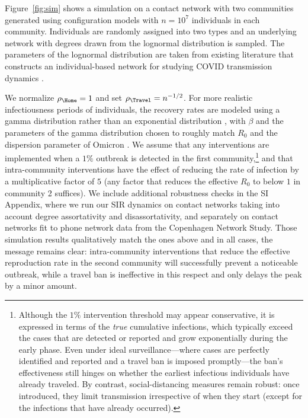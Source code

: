 \documentclass[11pt]{article}
\begin{document}
\newpage


\newpage

Figure~\ref{fig:sim} shows a simulation on a contact network with two communities generated using configuration models with $n = 10^7$ individuals in each community. Individuals are randomly assigned into two types and an underlying network with degrees drawn from the lognormal distribution is sampled. The parameters of the lognormal distribution are taken from existing literature that constructs an individual-based network for studying COVID transmission dynamics \cite{hill2021network}.

We normalize $\rho_\Home = 1$ and set $\rho_\Travel = n^{-1/2}$. For more realistic infectiousness periods of individuals, the recovery rates are modeled using a gamma distribution rather than an exponential distribution \cite{lloyd2001realistic, wearing2005appropriate}, with $\beta$ and the parameters of the gamma distribution chosen to roughly match $R_0$ and the dispersion parameter of Omicron \cite{kremer2022serial, sender2022unmitigated}. We assume that any interventions are implemented when a $1\%$ outbreak is detected in the first community,\footnote{Although the $1\%$ intervention threshold may appear conservative, it is expressed in terms of the \emph{true} cumulative infections, which typically exceed the cases that are detected or reported and grow exponentially during the early phase. Even under ideal surveillance---where cases are perfectly identified and reported and a travel ban is imposed promptly---the ban's effectiveness still hinges on whether the earliest infectious individuals have already traveled. By contrast, social-distancing measures remain robust: once introduced, they limit transmission irrespective of when they start (except for the infections that have already occurred).} and that intra-community interventions have the effect of reducing the rate of infection by a multiplicative factor of $5$ (any factor that reduces the effective $R_0$ to below $1$ in community 2 suffices). We include additional robustness checks in the SI Appendix, where we run our SIR dynamics on contact networks taking into account degree assortativity and disassortativity, and separately on contact networks fit to phone network data from the Copenhagen Network Study. Those simulation results qualitatively match the ones above and in all cases, the message remains clear: intra-community interventions that reduce the effective reproduction rate in the second community will successfully prevent a noticeable outbreak, while a travel ban is ineffective in this respect and only delays the peak by a minor amount.
\end{document}
